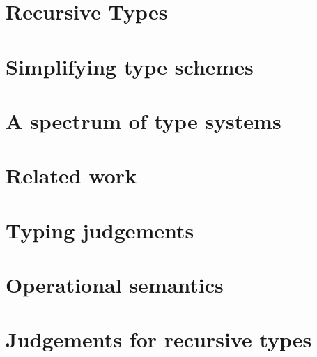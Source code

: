 \documentclass{article}
\begin{document}
\section{Recursive Types}

\section{Simplifying type schemes}

\section{A spectrum of type systems}

\section{Related work}

\appendix
\section{Typing judgements}
\ottdefnsTyping
\section{Operational semantics}
\ottdefnsSemantics
\section{Judgements for recursive types}
\end{document}
